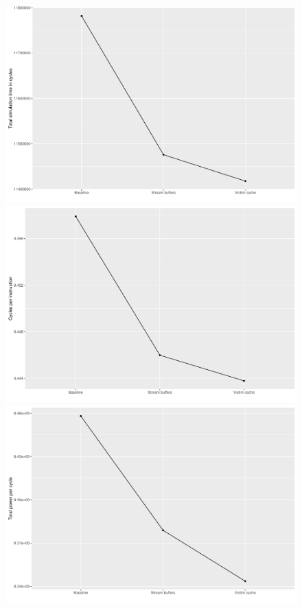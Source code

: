 \documentclass[10pt]{scrartcl}
\begin{document}
\begin{figure}[h!]
  \includegraphics[width=\linewidth]{./Plots/anagram_1.pdf}
\endminipage\hfill
{}
  \includegraphics[width=\linewidth]{./Plots/anagram_2.pdf}
\endminipage\hfill
{}%
  \includegraphics[width=\linewidth]{./Plots/anagram_3.pdf}

\end{figure}
\end{document}
